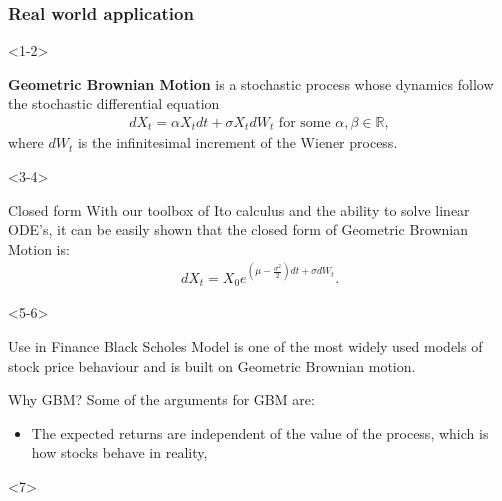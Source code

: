 \documentclass[10pt]{beamer}
\begin{document}
\begin{frame}[t]
  \frametitle{Real world application}
  \begin{onlyenv}<1-2>
    \begin{definition}
      \textbf{Geometric Brownian Motion} is a stochastic process whose dynamics follow the stochastic differential equation 
      \begin{align*}
        dX_t = \alpha X_t dt + \sigma X_t dW_t \text{ for some } \alpha,\beta \in \mathbb{R},
      \end{align*}
      where $dW_t$ is the infinitesimal increment of the Wiener process.
    \end{definition}
  \end{onlyenv}
  \begin{onlyenv}<3-4>
    \begin{block}{Closed form}
      With our toolbox of Ito calculus and the ability to solve linear ODE's, it can be easily shown that the closed form of Geometric Brownian Motion is:
      \begin{align*}
        dX_t = X_0 e^{(\mu - \frac{\sigma^2}{2})dt + \sigma dW_t}.
      \end{align*}
    \end{block}
  \end{onlyenv}
  \begin{onlyenv}<5-6>
    \begin{block}{Use in Finance}
      Black Scholes Model is one of the most widely used models of stock price behaviour and is built on Geometric Brownian motion.
    \end{block}
    \begin{block}{Why GBM?}
      Some of the arguments for GBM are:
      \begin{itemize}
        \item<6-> The expected returns are independent of the value of the process, which is how stocks behave in reality,
      \end{itemize}
    \end{block}
  \end{onlyenv}
  \begin{onlyenv}<7>

\end{onlyenv}
\end{frame}
\end{document}
